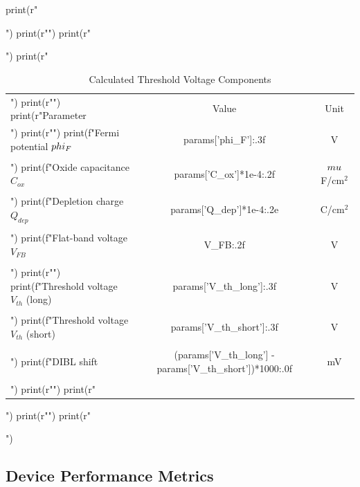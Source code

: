\documentclass[a4paper, 11pt]{article}
\begin{document}
\begin{pycode}
print(r"\begin{table}[htbp]")
print(r"\centering")
print(r"\caption{Calculated Threshold Voltage Components}")
print(r"\begin{tabular}{lcc}")
print(r"\toprule")
print(r"Parameter & Value & Unit \\")
print(r"\midrule")
print(f"Fermi potential $\\phi_F$ & {params['phi_F']:.3f} & V \\\\")
print(f"Oxide capacitance $C_{{ox}}$ & {params['C_ox']*1e-4:.2f} & $\\mu$F/cm$^2$ \\\\")
print(f"Depletion charge $Q_{{dep}}$ & {params['Q_dep']*1e-4:.2e} & C/cm$^2$ \\\\")
print(f"Flat-band voltage $V_{{FB}}$ & {V_FB:.2f} & V \\\\")
print(r"\midrule")
print(f"Threshold voltage $V_{{th}}$ (long) & {params['V_th_long']:.3f} & V \\\\")
print(f"Threshold voltage $V_{{th}}$ (short) & {params['V_th_short']:.3f} & V \\\\")
print(f"DIBL shift & {(params['V_th_long'] - params['V_th_short'])*1000:.0f} & mV \\\\")
print(r"\bottomrule")
print(r"\end{tabular}")
print(r"\label{tab:threshold}")
print(r"\end{table}")
\end{pycode}

\subsection{Device Performance Metrics}
\end{document}
